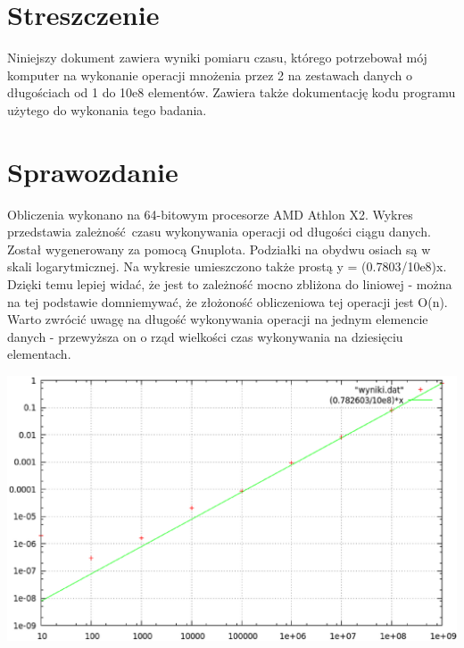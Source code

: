 \part{Streszczenie}
Niniejszy dokument zawiera wyniki pomiaru czasu, którego potrzebował mój komputer na wykonanie operacji mnożenia przez 2 na zestawach danych o długościach od 1 do 10e8 elementów. Zawiera także dokumentację kodu programu użytego do wykonania tego badania.

\part{Sprawozdanie}
Obliczenia wykonano na 64-bitowym procesorze AMD Athlon X2. Wykres przedstawia zależność czasu wykonywania operacji od długości ciągu danych. Został wygenerowany za pomocą Gnuplota. Podziałki na obydwu osiach są w skali logarytmicznej. Na wykresie umieszczono także prostą y = (0.7803/10e8)x. Dzięki temu lepiej widać, że jest to zależność mocno zbliżona do liniowej - można na tej podstawie domniemywać, że złożoność obliczeniowa tej operacji jest O(n). Warto zwrócić uwagę na długość wykonywania operacji na jednym elemencie danych - przewyższa on o rząd wielkości czas wykonywania na dziesięciu elementach.
\centerline{\includegraphics[width=\textwidth,height=\textheight,keepaspectratio]{wykres1.eps}}
